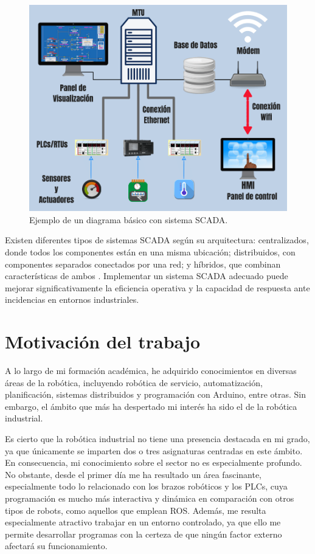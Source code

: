 \begin{figure} [h!]
  \begin{center}
    \includegraphics[width=15cm]{figs/SCADA}
  \end{center}
  \caption{\centering Ejemplo de un diagrama básico con sistema SCADA. \cite{scada_img}}
  \label{fig:SCADA}
\end{figure} 

Existen diferentes tipos de sistemas SCADA según su arquitectura: centralizados, donde todos los componentes están en una misma ubicación; distribuidos, con componentes separados conectados por una red; y híbridos, que combinan características de ambos \cite{scada}. Implementar un sistema SCADA adecuado puede mejorar significativamente la eficiencia operativa y la capacidad de respuesta ante incidencias en entornos industriales.

\section{Motivación del trabajo}
\label{sec:cuartaseccion}

A lo largo de mi formación académica, he adquirido conocimientos en diversas áreas de la robótica, incluyendo robótica de servicio, automatización, planificación, sistemas distribuidos y programación con Arduino, entre otras. Sin embargo, el ámbito que más ha despertado mi interés ha sido el de la robótica industrial. 

Es cierto que la robótica industrial no tiene una presencia destacada en mi grado, ya que únicamente se imparten dos o tres asignaturas centradas en este ámbito. En consecuencia, mi conocimiento sobre el sector no es especialmente profundo. No obstante, desde el primer día me ha resultado un área fascinante, especialmente todo lo relacionado con los brazos robóticos y los PLCs, cuya programación es mucho más interactiva y dinámica en comparación con otros tipos de robots, como aquellos que emplean ROS. Además, me resulta especialmente atractivo trabajar en un entorno controlado, ya que ello me permite desarrollar programas con la certeza de que ningún factor externo afectará su funcionamiento. 

